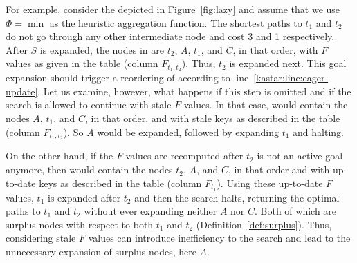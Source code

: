 For example, consider the \kgs depicted in Figure~\ref{fig:lazy} and assume that we use $\Phi = \min$ as the heuristic aggregation function. %
The shortest paths to $t_1$ and $t_2$ do not go through any other intermediate node and cost 3 and 1 respectively.
After $S$ is expanded, the nodes in \open are $t_2$, $A$, $t_1$, and $C$, in that order, with $F$ values as given in the table (column $F_{t_1,t_2}$).
Thus, $t_2$ is expanded next.
This goal expansion should trigger a reordering of \open according to line~\ref{kastar:line:eager-update}.
Let us examine, however, what happens if this step is omitted and if the search is allowed to continue with stale $F$ values.
In that case, \open would contain the nodes $A$, $t_1$, and $C$, in that order, and with stale keys as described in the table (column $F_{t_1,t_2}$).
So $A$ would be expanded, followed by expanding $t_1$ and halting.

On the other hand, if the $F$ values are recomputed after $t_2$ is not an active goal anymore, then \open would contain the nodes $t_2$, $A$, and $C$, in that order and with up-to-date keys as described in the table (column $F_{t_1}$).
Using these up-to-date $F$ values, $t_1$ is expanded after $t_2$ and then the search halts, returning the optimal paths to $t_1$ and $t_2$ without ever expanding neither $A$ nor $C$.
Both of which are surplus nodes with respect to both $t_1$ and $t_2$ (Definition~\ref{def:surplus}).
Thus, considering stale $F$ values can introduce inefficiency to the search and lead to the unnecessary expansion of surplus nodes, here $A$.



